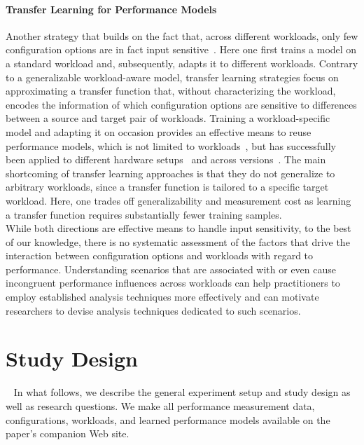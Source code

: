 \paragraph{Transfer Learning for Performance Models}\label{sec:transfer}
Another strategy that builds on the fact that, across different workloads, only few configuration options are in fact input sensitive~\cite{jamishidi_transfer_2017}. Here one first trains a model on a standard workload and, subsequently, adapts it to different workloads. Contrary to a generalizable workload-aware model, transfer learning strategies focus on approximating a transfer function that, without characterizing the workload, encodes the information of which configuration options are sensitive to differences between a source and target pair of workloads. Training a workload-specific model and adapting it on occasion provides an effective means to reuse performance models, which is not limited to workloads~\cite{jamshidi_learning_2018}, but has successfully been applied to different hardware setups~\cite{ding_bayesian_2020,valov_transferring_performance_2017} and across versions~\cite{martin_transfer_2021}. The main shortcoming of transfer learning approaches is that they do not generalize to arbitrary workloads, since a transfer function is tailored to a specific target workload. Here, one trades off generalizability and measurement cost as learning a transfer function requires substantially fewer training samples.\\

While both directions are effective means to handle input sensitivity, to the best of our knowledge, there is no systematic assessment of the factors that drive the interaction between configuration options and workloads with regard to performance. Understanding scenarios that are associated with or even cause incongruent performance influences across workloads can help practitioners to employ established analysis techniques more effectively and can motivate researchers to devise analysis techniques dedicated to such scenarios.

\section{Study Design}~\label{sec:study}
In what follows, we describe the general experiment setup and study design as well as research questions. We make all performance measurement data, configurations, workloads, and learned performance models available on the paper's companion Web site.

